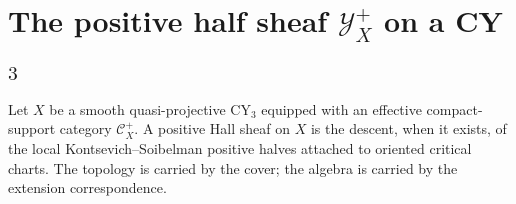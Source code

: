 
\providecommand{\Hom}{\mathrm{Hom}}
\providecommand{\End}{\mathrm{End}}
\providecommand{\Ext}{\mathrm{Ext}}
\providecommand{\Spec}{\mathrm{Spec}}
\providecommand{\Coh}{\mathrm{Coh}}
\providecommand{\CoHA}{\mathrm{CoHA}}
\providecommand{\Crit}{\mathrm{Crit}}
\providecommand{\Mod}{\text{-}\mathrm{Mod}}
\providecommand{\Db}{D^{b}}
\providecommand{\GL}{\mathrm{GL}}
\providecommand{\cC}{\mathcal C}
\providecommand{\cY}{\mathcal Y}
\providecommand{\cU}{\mathcal U}
\providecommand{\cF}{\mathcal F}
\providecommand{\cH}{\mathcal H}
\providecommand{\cO}{\mathcal O}
\providecommand{\cM}{\mathcal M}
\providecommand{\cA}{\mathcal A}
\providecommand{\bA}{\mathbb A}
\providecommand{\bC}{\mathbb C}
\providecommand{\bQ}{\mathbb Q}
\providecommand{\bZ}{\mathbb Z}
\providecommand{\BM}{\mathrm{BM}}
\providecommand{\Rep}{\mathrm{Rep}}
\providecommand{\Tr}{\mathrm{Tr}}
\providecommand{\Tot}{\mathrm{Tot}}
\providecommand{\cZ}{\mathcal Z}
\providecommand{\kBKM}{\kappa_{\mathrm{BKM}}}
\providecommand{\kch}{\kappa_{\mathrm{ch}}}
\providecommand{\kcat}{\kappa_{\mathrm{cat}}}
\providecommand{\kfiber}{\kappa_{\mathrm{fiber}}}

\section*{The positive half sheaf $\cY^{+}_{X}$ on a CY$_3$}

Let $X$ be a smooth quasi-projective CY$_3$ equipped with an effective
compact-support category $\cC_X^{+}$.  A positive Hall sheaf on $X$ is
the descent, when it exists, of the local Kontsevich--Soibelman
positive halves attached to oriented critical charts.  The topology is
carried by the cover; the algebra is carried by the extension
correspondence.

